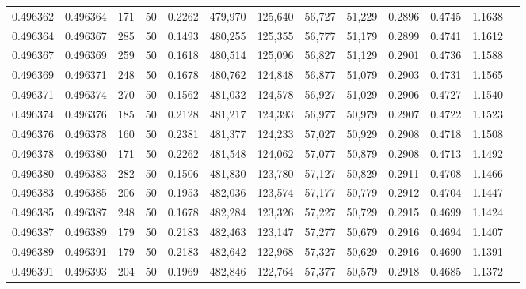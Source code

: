 \begin{tabular}{rrrrrrrrrrrrr}
0.496362 & 0.496364 &   171 &  50 &                                     0.2262 & 479,970 & 125,640 &  56,727 &  51,229 & 0.2896 & 0.4745 & 1.1638 \\
0.496364 & 0.496367 &   285 &  50 &                                     0.1493 & 480,255 & 125,355 &  56,777 &  51,179 & 0.2899 & 0.4741 & 1.1612 \\
0.496367 & 0.496369 &   259 &  50 &                                     0.1618 & 480,514 & 125,096 &  56,827 &  51,129 & 0.2901 & 0.4736 & 1.1588 \\
0.496369 & 0.496371 &   248 &  50 &                                     0.1678 & 480,762 & 124,848 &  56,877 &  51,079 & 0.2903 & 0.4731 & 1.1565 \\
0.496371 & 0.496374 &   270 &  50 &                                     0.1562 & 481,032 & 124,578 &  56,927 &  51,029 & 0.2906 & 0.4727 & 1.1540 \\
0.496374 & 0.496376 &   185 &  50 &                                     0.2128 & 481,217 & 124,393 &  56,977 &  50,979 & 0.2907 & 0.4722 & 1.1523 \\
0.496376 & 0.496378 &   160 &  50 &                                     0.2381 & 481,377 & 124,233 &  57,027 &  50,929 & 0.2908 & 0.4718 & 1.1508 \\
0.496378 & 0.496380 &   171 &  50 &                                     0.2262 & 481,548 & 124,062 &  57,077 &  50,879 & 0.2908 & 0.4713 & 1.1492 \\
0.496380 & 0.496383 &   282 &  50 &                                     0.1506 & 481,830 & 123,780 &  57,127 &  50,829 & 0.2911 & 0.4708 & 1.1466 \\
0.496383 & 0.496385 &   206 &  50 &                                     0.1953 & 482,036 & 123,574 &  57,177 &  50,779 & 0.2912 & 0.4704 & 1.1447 \\
0.496385 & 0.496387 &   248 &  50 &                                     0.1678 & 482,284 & 123,326 &  57,227 &  50,729 & 0.2915 & 0.4699 & 1.1424 \\
0.496387 & 0.496389 &   179 &  50 &                                     0.2183 & 482,463 & 123,147 &  57,277 &  50,679 & 0.2916 & 0.4694 & 1.1407 \\
0.496389 & 0.496391 &   179 &  50 &                                     0.2183 & 482,642 & 122,968 &  57,327 &  50,629 & 0.2916 & 0.4690 & 1.1391 \\
0.496391 & 0.496393 &   204 &  50 &                                     0.1969 & 482,846 & 122,764 &  57,377 &  50,579 & 0.2918 & 0.4685 & 1.1372 \\

\end{tabular}
